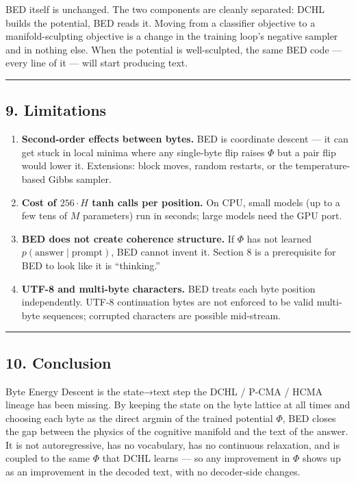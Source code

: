 \documentclass[
  11pt,
  a4paper,
]{article}
\providecommand{\tightlist}{%
  \setlength{\itemsep}{0pt}\setlength{\parskip}{0pt}}
\begin{document}
BED itself is unchanged. The two components are cleanly separated: DCHL
builds the potential, BED reads it. Moving from a classifier objective
to a manifold-sculpting objective is a change in the training loop's
negative sampler and in nothing else. When the potential is
well-sculpted, the same BED code --- every line of it --- will start
producing text.

\begin{center}\rule{0.5\linewidth}{0.5pt}\end{center}

\subsection{9. Limitations}\label{limitations}

\begin{enumerate}
\def\labelenumi{\arabic{enumi}.}
\tightlist
\item
  \textbf{Second-order effects between bytes.} BED is coordinate descent
  --- it can get stuck in local minima where any single-byte flip raises
  \(\Phi\) but a pair flip would lower it. Extensions: block moves,
  random restarts, or the temperature-based Gibbs sampler.
\item
  \textbf{Cost of \(256 \cdot H\) tanh calls per position.} On CPU,
  small models (up to a few tens of \(M\) parameters) run in seconds;
  large models need the GPU port.
\item
  \textbf{BED does not create coherence structure.} If \(\Phi\) has not
  learned \(p(\text{answer} \mid \text{prompt})\), BED cannot invent it.
  Section 8 is a prerequisite for BED to look like it is ``thinking.''
\item
  \textbf{UTF-8 and multi-byte characters.} BED treats each byte
  position independently. UTF-8 continuation bytes are not enforced to
  be valid multi-byte sequences; corrupted characters are possible
  mid-stream.
\end{enumerate}

\begin{center}\rule{0.5\linewidth}{0.5pt}\end{center}

\subsection{10. Conclusion}\label{conclusion}

Byte Energy Descent is the state→text step the DCHL / P-CMA / HCMA
lineage has been missing. By keeping the state on the byte lattice at
all times and choosing each byte as the direct argmin of the trained
potential \(\Phi\), BED closes the gap between the physics of the
cognitive manifold and the text of the answer. It is not autoregressive,
has no vocabulary, has no continuous relaxation, and is coupled to the
same \(\Phi\) that DCHL learns --- so any improvement in \(\Phi\) shows
up as an improvement in the decoded text, with no decoder-side changes.
\end{document}
